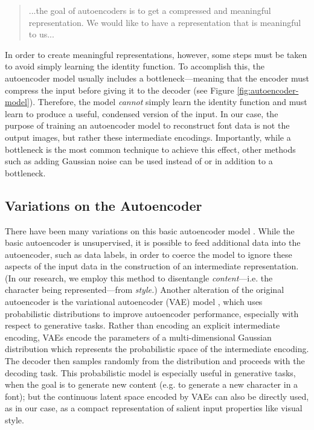 \begin{quote}
    ...the goal of autoencoders is to get a compressed and meaningful
    representation. We would like to have a representation that is meaningful to us...
\end{quote}

In order to create meaningful representations, however, some steps must be taken to avoid simply learning the identity function. To accomplish this, the autoencoder model usually includes a bottleneck---meaning that the encoder must compress the input before giving it to the decoder (see Figure \ref{fig:autoencoder-model}). Therefore, the model \emph{cannot} simply learn the identity function and must learn to produce a useful, condensed version of the input. In our case, the purpose of training an autoencoder model to reconstruct font data is not the output images, but rather these intermediate encodings. Importantly, while a bottleneck is the most common technique to achieve this effect, other methods such as adding Gaussian noise \cite{bank2021autoencoders} can be used instead of or in addition to a bottleneck.

\subsection{Variations on the Autoencoder}

There have been many variations on this basic autoencoder model \cite{michelucci2022}. While the basic autoencoder is unsupervised, it is possible to feed additional data into the autoencoder, such as data labels, in order to coerce the model to ignore these aspects of the input data in the construction of an intermediate representation. (In our research, we employ this method to disentangle \textit{content}---i.e. the character being represented---from \textit{style.}) Another alteration of the original autoencoder is the variational autoencoder (VAE) model \cite{kingma2013}, which uses probabilistic distributions to improve autoencoder performance, especially with respect to generative tasks. Rather than encoding an explicit intermediate encoding, VAEs encode the parameters of a multi-dimensional Gaussian distribution which represents the probabilistic space of the intermediate encoding. The decoder then samples randomly from the distribution and proceeds with the decoding task. This probabilistic model is especially useful in generative tasks, when the goal is to generate new content (e.g. to generate a new character in a font); but the continuous latent space encoded by VAEs can also be directly used, as in our case, as a compact representation of salient input properties like visual style.

